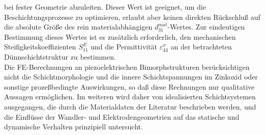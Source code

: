 bei fester Geometrie abzuleiten.
Dieser Wert ist geeignet, um die Beschichtungsprozesse zu optimieren,
erlaubt aber keinen direkten Rückschluß auf die absolute Größe des rein
materialabhängigen $d^{mat}_{31}$-Wertes. Zur eindeutigen Bestimmung dieses
Wertes ist es zusätzlich erforderlich, den mechanischen
Steifigkeitskoeffizienten $S^{E}_{11}$ und die Permittivität
$\varepsilon^{\sigma}_{33}$ an der betrachteten Dünnschichtstruktur zu
bestimmen.\\
%
Die FE-Berechnungen an piezoelektrischen Bimorphstrukturen berücksichtigen
nicht die Schichtmorphologie und die innere Schichtspannungen im Zinkoxid
oder sonstige prozeßbedingte Auswirkungen, so daß diese Rechnungen nur
qualitative Aussagen ermöglichen. Im weiteren wird daher von idealisierten
Schichtsystemen ausgegangen, die durch die Materialdaten der Literatur
beschrieben werden, und die Einflüsse der Wandler- und Elektrodengeometrien
auf das statische und dynamische Verhalten prinzipiell untersucht.

